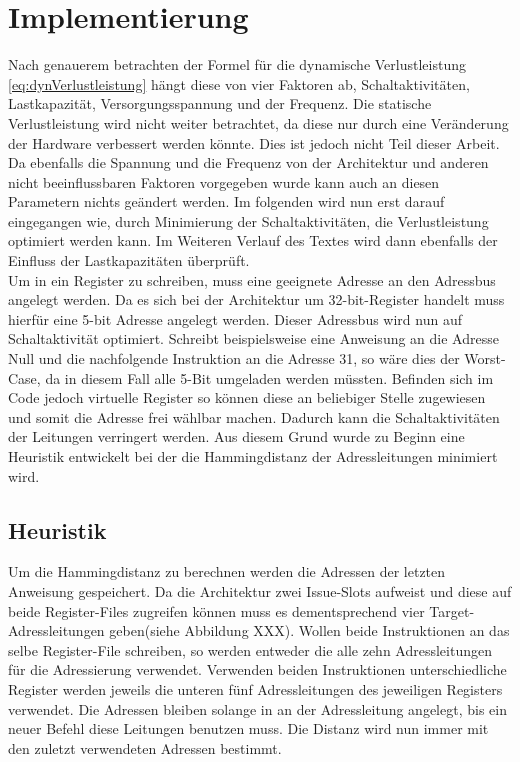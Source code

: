 \chapter{Implementierung}
\label{chap:Implementierung}

Nach genauerem betrachten der Formel für die dynamische Verlustleistung \ref{eq:dynVerlustleistung} hängt diese von vier Faktoren ab, Schaltaktivitäten,  Lastkapazität, Versorgungsspannung und der Frequenz. Die statische Verlustleistung wird nicht weiter betrachtet, da diese nur durch eine Veränderung der Hardware verbessert werden könnte. Dies ist jedoch nicht Teil dieser Arbeit. Da ebenfalls die Spannung und die Frequenz von der Architektur und anderen nicht beeinflussbaren Faktoren vorgegeben wurde kann auch an diesen Parametern nichts geändert werden. Im folgenden wird nun erst darauf eingegangen wie, durch Minimierung der Schaltaktivitäten, die Verlustleistung optimiert werden kann. Im Weiteren Verlauf des Textes wird dann ebenfalls der Einfluss der Lastkapazitäten überprüft.\\
Um in ein Register zu schreiben, muss eine geeignete Adresse an den Adressbus angelegt werden. Da es sich bei der Architektur um 32-bit-Register handelt muss hierfür eine 5-bit Adresse angelegt werden. Dieser Adressbus wird nun auf Schaltaktivität optimiert. Schreibt beispielsweise eine Anweisung an die Adresse Null und die nachfolgende Instruktion an die Adresse 31, so wäre dies der Worst-Case, da in diesem Fall alle 5-Bit umgeladen werden müssten. Befinden sich im Code jedoch virtuelle Register so können diese an beliebiger Stelle zugewiesen und somit die Adresse frei wählbar machen. Dadurch kann die Schaltaktivitäten der Leitungen verringert werden. Aus diesem Grund wurde zu Beginn eine Heuristik entwickelt bei der die Hammingdistanz der Adressleitungen minimiert wird.
\section{Heuristik}
\label{sec:Heuristik}
Um die Hammingdistanz zu berechnen werden die Adressen der letzten Anweisung gespeichert. Da die Architektur zwei Issue-Slots aufweist und diese auf beide Register-Files zugreifen können muss es dementsprechend vier Target-Adressleitungen geben(siehe Abbildung XXX). Wollen beide Instruktionen an das selbe Register-File schreiben, so werden entweder die alle zehn Adressleitungen für die Adressierung verwendet. Verwenden beiden Instruktionen unterschiedliche Register werden jeweils die unteren fünf Adressleitungen des jeweiligen Registers verwendet. Die Adressen bleiben solange in an der Adressleitung angelegt, bis ein neuer Befehl diese Leitungen benutzen muss. Die Distanz wird nun immer mit den zuletzt verwendeten Adressen bestimmt. 